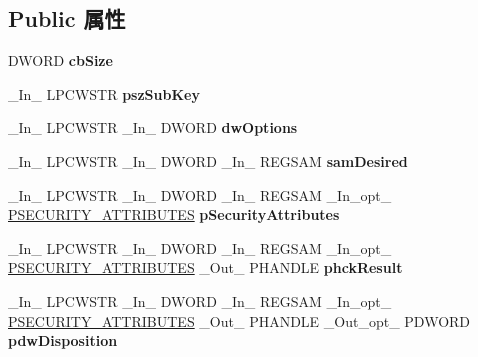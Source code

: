 \subsection*{Public 属性}
\begin{DoxyCompactItemize}
\item 
\mbox{\label{struct___m_o_n_i_t_o_r_r_e_g_a2432f3d281145a99b0ccfbb647615e5c}} 
D\+W\+O\+RD {\bfseries cb\+Size}
\item 
\mbox{\label{struct___m_o_n_i_t_o_r_r_e_g_a5100841aebe528981410af73eb68b351}} 
\+\_\+\+In\+\_\+ L\+P\+C\+W\+S\+TR {\bfseries psz\+Sub\+Key}
\item 
\mbox{\label{struct___m_o_n_i_t_o_r_r_e_g_a54647b130c2173fd05b9985b3a264179}} 
\+\_\+\+In\+\_\+ L\+P\+C\+W\+S\+TR \+\_\+\+In\+\_\+ D\+W\+O\+RD {\bfseries dw\+Options}
\item 
\mbox{\label{struct___m_o_n_i_t_o_r_r_e_g_a97d81bf3c53ea21a1b49f90b82ac039a}} 
\+\_\+\+In\+\_\+ L\+P\+C\+W\+S\+TR \+\_\+\+In\+\_\+ D\+W\+O\+RD \+\_\+\+In\+\_\+ R\+E\+G\+S\+AM {\bfseries sam\+Desired}
\item 
\mbox{\label{struct___m_o_n_i_t_o_r_r_e_g_a2a15d62fc071eab768791148bbeec25e}} 
\+\_\+\+In\+\_\+ L\+P\+C\+W\+S\+TR \+\_\+\+In\+\_\+ D\+W\+O\+RD \+\_\+\+In\+\_\+ R\+E\+G\+S\+AM \+\_\+\+In\+\_\+opt\+\_\+ \hyperlink{struct___s_e_c_u_r_i_t_y___a_t_t_r_i_b_u_t_e_s}{P\+S\+E\+C\+U\+R\+I\+T\+Y\+\_\+\+A\+T\+T\+R\+I\+B\+U\+T\+ES} {\bfseries p\+Security\+Attributes}
\item 
\mbox{\label{struct___m_o_n_i_t_o_r_r_e_g_a0c17ac205915f7386f95fd3e0dba2a41}} 
\+\_\+\+In\+\_\+ L\+P\+C\+W\+S\+TR \+\_\+\+In\+\_\+ D\+W\+O\+RD \+\_\+\+In\+\_\+ R\+E\+G\+S\+AM \+\_\+\+In\+\_\+opt\+\_\+ \hyperlink{struct___s_e_c_u_r_i_t_y___a_t_t_r_i_b_u_t_e_s}{P\+S\+E\+C\+U\+R\+I\+T\+Y\+\_\+\+A\+T\+T\+R\+I\+B\+U\+T\+ES} \+\_\+\+Out\+\_\+ P\+H\+A\+N\+D\+LE {\bfseries phck\+Result}
\item 
\mbox{\label{struct___m_o_n_i_t_o_r_r_e_g_ab9ea5367c61b225e96cec254f3eddc9d}} 
\+\_\+\+In\+\_\+ L\+P\+C\+W\+S\+TR \+\_\+\+In\+\_\+ D\+W\+O\+RD \+\_\+\+In\+\_\+ R\+E\+G\+S\+AM \+\_\+\+In\+\_\+opt\+\_\+ \hyperlink{struct___s_e_c_u_r_i_t_y___a_t_t_r_i_b_u_t_e_s}{P\+S\+E\+C\+U\+R\+I\+T\+Y\+\_\+\+A\+T\+T\+R\+I\+B\+U\+T\+ES} \+\_\+\+Out\+\_\+ P\+H\+A\+N\+D\+LE \+\_\+\+Out\+\_\+opt\+\_\+ P\+D\+W\+O\+RD {\bfseries pdw\+Disposition}

\end{DoxyCompactItemize}
